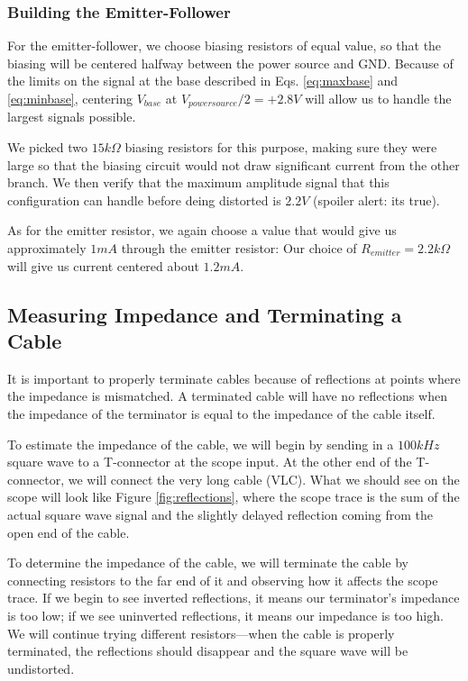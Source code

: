 \documentclass[12pt]{article}
\begin{document}
\subsubsection*{Building the Emitter-Follower}
For the emitter-follower, we choose biasing resistors of equal value, so that the biasing will be centered halfway between the power source and GND. Because of the limits on the signal at the base described in Eqs. \ref{eq:maxbase} and \ref{eq:minbase}, centering $V_{base}$ at $V_{powersource}/2=+2.8V$ will allow us to handle the largest signals possible.

We picked two $15k\Omega$ biasing resistors for this purpose, making sure they were large so that the biasing circuit would not draw significant current from the other branch. We then verify that the maximum amplitude signal that this configuration can handle before deing distorted is $2.2V$ (spoiler alert: its true).

As for the emitter resistor, we again choose a value that would give us approximately $1mA$ through the emitter resistor: Our choice of $R_{emitter}=2.2k\Omega$ will give us current centered about $1.2mA$.

\subsection*{Measuring Impedance and Terminating a Cable}
It is important to properly terminate cables because of reflections at points where the impedance is mismatched. A terminated cable will have no reflections when the impedance of the terminator is equal to the impedance of the cable itself.

To estimate the impedance of the cable, we will begin by sending in a $100kHz$ square wave to a T-connector at the scope input. At the other end of the T-connector, we will connect the very long cable (VLC). What we should see on the scope will look like Figure \ref{fig:reflections}, where the scope trace is the sum of the actual square wave signal and the slightly delayed reflection coming from the open end of the cable.

To determine the impedance of the cable, we will terminate the cable by connecting resistors to the far end of it and observing how it affects the scope trace. If we begin to see inverted reflections, it means our terminator's impedance is too low; if we see uninverted reflections, it means our impedance is too high. We will continue trying different resistors---when the cable is properly terminated, the reflections should disappear and the square wave will be undistorted.
\end{document}
